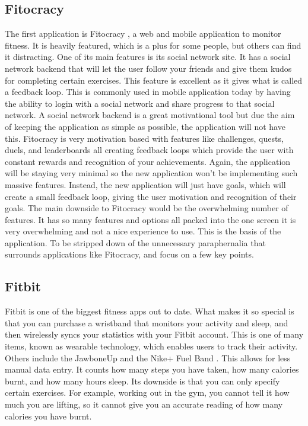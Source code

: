 \subsection{Fitocracy}
The first application is Fitocracy \citep{fitocracy:2007}, a web and mobile application to monitor fitness. It is heavily featured, which is a plus for some people, but others can find it distracting. One of its main features is its social network site. It has a social network backend that will let the user follow your friends and give them kudos for completing certain exercises. This feature is excellent as it gives what is called a feedback loop. This is commonly used in mobile application today by having the ability to login with a social network and share progress to that social network. A social network backend is a great motivational tool but due the aim of keeping the application as simple as possible, the application will not have this. Fitocracy is very motivation based with features like challenges, quests, duels, and leaderboards all creating feedback loops which provide the user with constant rewards and recognition of your achievements. Again, the application will be staying very minimal so the new application won't be implementing such massive features. Instead, the new application will just have goals, which will create a small feedback loop, giving the user motivation and recognition of their goals. The main downside to Fitocracy would be the overwhelming number of features. It has so many features and options all packed into the one screen it is very overwhelming and not a nice experience to use. This is the basis of the application. To be stripped down of the unnecessary paraphernalia that surrounds applications like Fitocracy, and focus on a few key points.


\subsection{Fitbit}
Fitbit is one of the biggest fitness apps out to date. What makes it so special is that you can purchase a wristband that monitors your activity and sleep, and then wirelessly syncs your statistics with your Fitbit account. This is one of many items, known as wearable technology, which enables users to track their activity. Others include the JawboneUp \citep{jawbone:2011} and the Nike+ Fuel Band \citep{nikefuelband:2012}. This allows for less manual data entry. It counts how many steps you have taken, how many calories burnt, and how many hours sleep. Its downside is that you can only specify certain exercises. For example, working out in the gym, you cannot tell it how much you are lifting, so it cannot give you an accurate reading of how many calories you have burnt.\\

